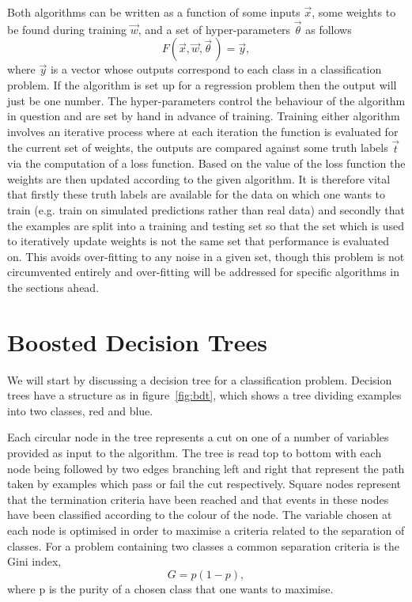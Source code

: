 Both algorithms can be written as a function of some inputs $\vec{x}$, some
weights to be found during training $\vec{w}$, and a set of hyper-parameters
$\vec{\theta}$ as follows
\begin{equation}
  F(\vec{x}, \vec{w}, \vec{\theta} \,) = \vec{y},
  \label{eq:ml-general}
\end{equation}
where $\vec{y}$ is a vector whose outputs correspond to each class in a
classification problem. If the algorithm is set up for a regression problem then
the output will just be one number. The hyper-parameters control the behaviour
of the algorithm in question and are set by hand in advance of training.
Training either algorithm involves an iterative process where at each iteration
the function is evaluated for the current set of weights, the outputs are
compared against some truth labels $\vec{t}$ via the computation of a loss
function. Based on the value of the loss function the weights are then updated
according to the given algorithm. It is therefore vital that firstly these truth
labels are available for the data on which one wants to train (e.g. train on
simulated predictions rather than real data) and secondly that the examples are
split into a training and testing set so that the set which is used to
iteratively update weights is not the same set that performance is evaluated on.
This avoids over-fitting to any noise in a given set, though this problem is not
circumvented entirely and over-fitting will be addressed for specific algorithms
in the sections ahead.

\section{Boosted Decision Trees}%
\label{sec:bdts}
We will start by discussing a decision tree for a classification problem.
Decision trees have a structure as in figure~\ref{fig:bdt}, which shows a tree
dividing examples into two classes, red and blue.

Each circular node in the tree represents a cut on one of a number of variables
provided as input to the algorithm. The tree is read top to bottom with each
node being followed by two edges branching left and right that represent the
path taken by examples which pass or fail the cut respectively. Square nodes
represent that the termination criteria have been reached and that events in
these nodes have been classified according to the colour of the node. The
variable chosen at each node is optimised in order to maximise a criteria
related to the separation of classes.  For a problem containing two classes a
common separation criteria is the Gini index,
\begin{equation}
  G = p(1-p),
  \label{eq:gini}
\end{equation}
where p is the purity of a chosen class that one wants to maximise.


